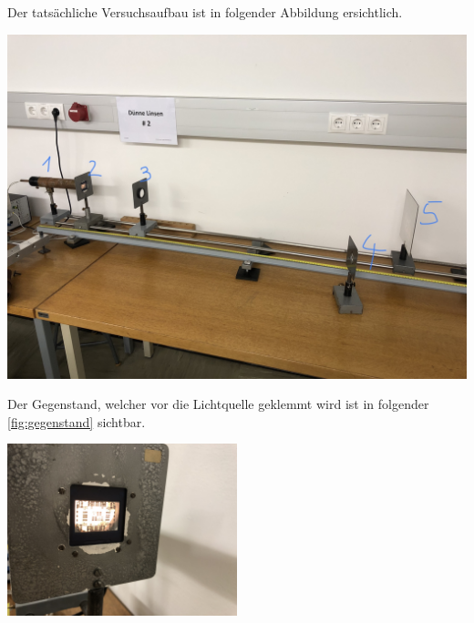 \documentclass[11pt,ngerman]{scrartcl}
\begin{document}
\newpage

Der tatsächliche Versuchsaufbau ist in folgender Abbildung ersichtlich.
\begin{center}
	\begin{minipage}[t]{\textwidth}
		\centering
		\includegraphics[width=\textwidth]{aufbau}
		\label{fig:aufbau}
	\end{minipage}
\end{center}

Der Gegenstand, welcher vor die Lichtquelle geklemmt wird ist in folgender \autoref{fig:gegenstand} sichtbar.

\begin{center}
	\begin{minipage}[t]{\textwidth}
		\centering
		\includegraphics[angle=180,width=0.5\textwidth]{gegenstand}
		\label{fig:gegenstand}
	\end{minipage}
\end{center}
\end{document}
